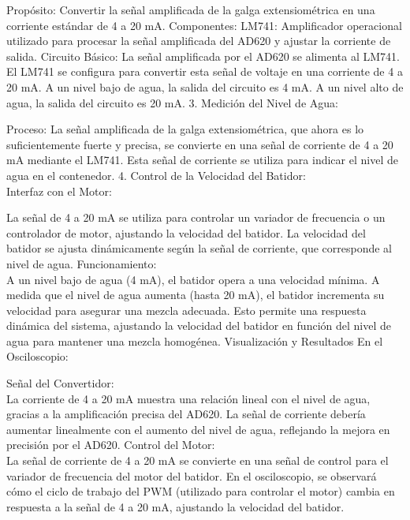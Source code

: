 \documentclass[esp]{ECCI-SIME-class}
\begin{document}
Propósito: Convertir la señal amplificada de la galga extensiométrica en una corriente estándar de 4 a 20 mA.
Componentes:
LM741: Amplificador operacional utilizado para procesar la señal amplificada del AD620 y ajustar la corriente de salida.
Circuito Básico:
La señal amplificada por el AD620 se alimenta al LM741.
El LM741 se configura para convertir esta señal de voltaje en una corriente de 4 a 20 mA.
A un nivel bajo de agua, la salida del circuito es 4 mA.
A un nivel alto de agua, la salida del circuito es 20 mA.
3. Medición del Nivel de Agua:

Proceso:
La señal amplificada de la galga extensiométrica, que ahora es lo suficientemente fuerte y precisa, se convierte en una señal de corriente de 4 a 20 mA mediante el LM741.
Esta señal de corriente se utiliza para indicar el nivel de agua en el contenedor.
4. Control de la Velocidad del Batidor: \\

Interfaz con el Motor:

La señal de 4 a 20 mA se utiliza para controlar un variador de frecuencia o un controlador de motor, ajustando la velocidad del batidor.
La velocidad del batidor se ajusta dinámicamente según la señal de corriente, que corresponde al nivel de agua.
Funcionamiento: \\

A un nivel bajo de agua (4 mA), el batidor opera a una velocidad mínima.
A medida que el nivel de agua aumenta (hasta 20 mA), el batidor incrementa su velocidad para asegurar una mezcla adecuada.
Esto permite una respuesta dinámica del sistema, ajustando la velocidad del batidor en función del nivel de agua para mantener una mezcla homogénea.
Visualización y Resultados
En el Osciloscopio:

Señal del Convertidor:\\

La corriente de 4 a 20 mA muestra una relación lineal con el nivel de agua, gracias a la amplificación precisa del AD620.
La señal de corriente debería aumentar linealmente con el aumento del nivel de agua, reflejando la mejora en precisión por el AD620.
Control del Motor: \\

La señal de corriente de 4 a 20 mA se convierte en una señal de control para el variador de frecuencia del motor del batidor.
En el osciloscopio, se observará cómo el ciclo de trabajo del PWM (utilizado para controlar el motor) cambia en respuesta a la señal de 4 a 20 mA, ajustando la velocidad del batidor. \\
\end{document}
